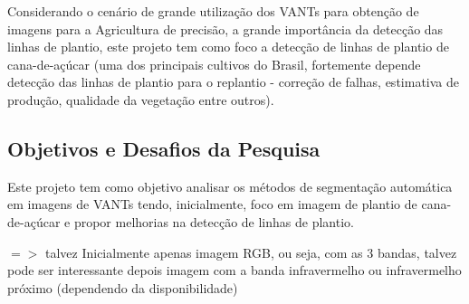 \documentclass[12pt, a4paper, english, brazil]{article}
\newcommand{\textRed}[1]{{{\color{red} #1}}}
\begin{document}
Considerando o cenário de grande utilização dos VANTs para obtenção de imagens para a Agricultura de precisão, a grande importância da detecção das linhas de plantio, este projeto tem como foco a detecção de linhas de plantio de cana-de-açúcar (uma dos principais cultivos do Brasil, fortemente depende detecção das linhas de plantio para o replantio - correção de falhas, estimativa de produção, qualidade da vegetação entre outros).

 
\subsection{Objetivos e Desafios da Pesquisa}

Este projeto tem como objetivo analisar os métodos de segmentação automática em imagens de VANTs tendo, inicialmente, foco em imagem de plantio de cana-de-açúcar e propor melhorias na detecção de linhas de plantio. 

$=>$ \textRed{talvez} Inicialmente apenas imagem RGB, ou seja, com as 3 bandas, talvez pode ser interessante depois imagem com a banda infravermelho ou infravermelho próximo (dependendo da disponibilidade)
\end{document}
